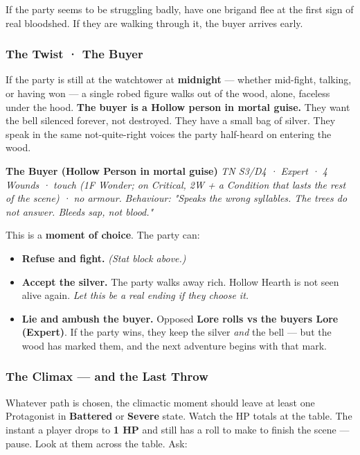 \documentclass[10pt,a4paper]{article}
\newcommand{\tightlist}{\setlength{\itemsep}{0pt}\setlength{\parskip}{0pt}}
\begin{document}
If the party seems to be struggling badly, have one brigand flee at the first sign of real bloodshed. If they are walking through it, the buyer arrives early.

\subsubsection{The Twist · The Buyer}\label{the-twist--the-buyer}

If the party is still at the watchtower at \textbf{midnight} --- whether mid-fight, talking, or having won --- a single robed figure walks out of the wood, alone, faceless under the hood. \textbf{The buyer is a Hollow person in mortal guise.} They want the bell silenced forever, not destroyed. They have a small bag of silver. They speak in the same not-quite-right voices the party half-heard on entering the wood.

\par\smallskip\begin{rpgnote}[fontupper=\normalfont]\textbf{The Buyer (Hollow Person in mortal guise)} \emph{TN S3/D4 · Expert · 4 Wounds · touch (1F Wonder; on Critical, 2W + a Condition that lasts the rest of the scene) · no armour.} \emph{Behaviour: "Speaks the wrong syllables. The trees do not answer. Bleeds sap, not blood."}\end{rpgnote}\par\smallskip
This is a \textbf{moment of choice}. The party can:

\begin{itemize}
\tightlist
\item
  \textbf{Refuse and fight.} \emph{(Stat block above.)}
\item
  \textbf{Accept the silver.} The party walks away rich. Hollow Hearth is not seen alive again. \emph{Let this be a real ending if they choose it.}
\item
  \textbf{Lie and ambush the buyer.} Opposed \textbf{Lore rolls vs the buyer\textquotesingle s Lore (Expert)}. If the party wins, they keep the silver \emph{and} the bell --- but the wood has marked them, and the next adventure begins with that mark.
\end{itemize}

\subsubsection{The Climax --- and the Last Throw}\label{the-climax--and-the-last-throw}

Whatever path is chosen, the climactic moment should leave at least one Protagonist in \textbf{Battered} or \textbf{Severe} state. Watch the HP totals at the table. The instant a player drops to \textbf{1 HP} and still has a roll to make to finish the scene --- pause. Look at them across the table. Ask:
\end{document}
